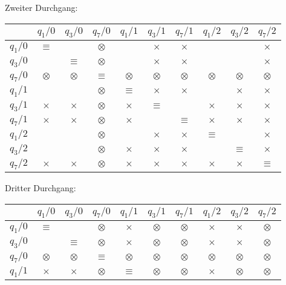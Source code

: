 \begin{loesung}
\begin{teilaufgaben}
\begin{center}
\begin{tabular}{|c|ccccccccc|}
\hline
\end{tabular}
\end{center}
Zweiter Durchgang:
\begin{center}
\begin{tabular}{|c|ccccccccc|}
\hline
         &$q_1/0$  &$q_3/0$  &$q_7/0$  &$q_1/1$  &$q_3/1$  &$q_7/1$  &$q_1/2$  &$q_3/2$  &$q_7/2$  \\
\hline
$q_1/0$  &$\equiv$ &         &$\otimes$&         &$\times$ &$\times$ &         &         &$\times$ \\
$q_3/0$  &         &$\equiv$ &$\otimes$&         &$\times$ &$\times$ &         &         &$\times$ \\
$q_7/0$  &$\otimes$&$\otimes$&$\equiv$ &$\otimes$&$\otimes$&$\otimes$&$\otimes$&$\otimes$&$\otimes$\\
$q_1/1$  &         &         &$\otimes$&$\equiv$ &$\times$ &$\times$ &         &$\times$ &$\times$ \\
$q_3/1$  &$\times$ &$\times$ &$\otimes$&$\times$ &$\equiv$ &         &$\times$ &$\times$ &$\times$ \\
$q_7/1$  &$\times$ &$\times$ &$\otimes$&$\times$ &         &$\equiv$ &$\times$ &$\times$ &$\times$ \\
$q_1/2$  &         &         &$\otimes$&         &$\times$ &$\times$ &$\equiv$ &         &$\times$ \\
$q_3/2$  &         &         &$\otimes$&$\times$ &$\times$ &$\times$ &         &$\equiv$ &$\times$ \\
$q_7/2$  &$\times$ &$\times$ &$\otimes$&$\times$ &$\times$ &$\times$ &$\times$ &$\times$ &$\equiv$ \\
\hline
\end{tabular}
\end{center}
Dritter Durchgang:
\begin{center}
\begin{tabular}{|c|ccccccccc|}
\hline
         &$q_1/0$  &$q_3/0$  &$q_7/0$  &$q_1/1$  &$q_3/1$  &$q_7/1$  &$q_1/2$  &$q_3/2$  &$q_7/2$  \\
\hline
$q_1/0$  &$\equiv$ &         &$\otimes$&$\times$ &$\otimes$&$\otimes$&$\times$ &$\times$ &$\otimes$\\
$q_3/0$  &         &$\equiv$ &$\otimes$&$\times$ &$\otimes$&$\otimes$&$\times$ &$\times$ &$\otimes$\\
$q_7/0$  &$\otimes$&$\otimes$&$\equiv$ &$\otimes$&$\otimes$&$\otimes$&$\otimes$&$\otimes$&$\otimes$\\
$q_1/1$  &$\times$ &$\times$ &$\otimes$&$\equiv$ &$\otimes$&$\otimes$&$\times$ &$\otimes$&$\otimes$\\

\end{tabular}
\end{center}
\end{teilaufgaben}
\end{loesung}
